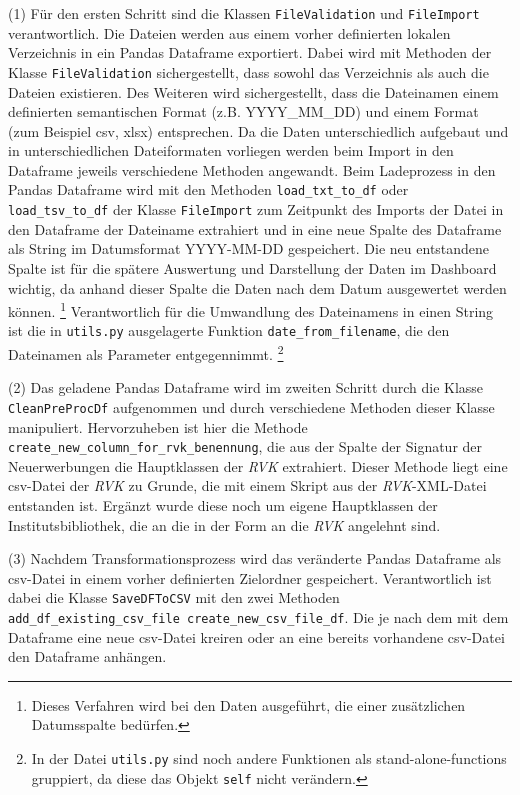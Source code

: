     
    (1) Für den ersten Schritt sind die Klassen \texttt{FileValidation} und \texttt{FileImport} verantwortlich.
    Die Dateien werden aus einem vorher definierten lokalen Verzeichnis in ein Pandas Dataframe exportiert. 
    Dabei wird mit Methoden der Klasse \texttt{FileValidation} sichergestellt, dass sowohl das Verzeichnis als auch die Dateien existieren. 
    Des Weiteren wird sichergestellt, dass die Dateinamen einem definierten semantischen Format (z.B. YYYY\_MM\_DD) und 
    einem Format (zum Beispiel csv, xlsx) entsprechen. Da die Daten unterschiedlich aufgebaut und in unterschiedlichen Dateiformaten vorliegen 
    werden beim Import in den Dataframe jeweils verschiedene Methoden angewandt.
    Beim Ladeprozess in den Pandas Dataframe wird mit den Methoden \texttt{load\_txt\_to\_df} oder \texttt{load\_tsv\_to\_df} der Klasse \texttt{FileImport} 
    zum Zeitpunkt des Imports der Datei in den Dataframe der Dateiname extrahiert und in eine neue Spalte des Dataframe als String 
    im Datumsformat YYYY-MM-DD gespeichert. Die neu entstandene Spalte ist für die spätere Auswertung und Darstellung der Daten im Dashboard wichtig, 
    da anhand dieser Spalte die Daten nach dem Datum ausgewertet werden können.
    \footnote{Dieses Verfahren wird bei den Daten ausgeführt, die einer zusätzlichen Datumsspalte bedürfen.} 
    Verantwortlich für die Umwandlung des Dateinamens in einen String ist die in \texttt{utils.py} ausgelagerte Funktion \texttt{date\_from\_filename},
    die den Dateinamen als Parameter entgegennimmt.
    \footnote{In der Datei \texttt{utils.py} sind noch andere Funktionen als stand-alone-functions gruppiert, da diese das Objekt \texttt{self} nicht verändern.} 
    
    (2) Das geladene Pandas Dataframe wird im zweiten Schritt durch die Klasse \texttt{CleanPreProcDf} aufgenommen und durch verschiedene Methoden dieser Klasse
    manipuliert. Hervorzuheben ist hier die Methode \texttt{create\_new\_column\_for\_rvk\_benennung}, die aus der Spalte der Signatur 
    der Neuerwerbungen die Hauptklassen der \textit{\acrlong{RVK}} extrahiert. Dieser Methode liegt eine csv-Datei
    der \textit{\acrshort{RVK}} zu Grunde, die mit einem Skript aus der \textit{\acrshort{RVK}}-XML-Datei entstanden ist. Ergänzt wurde diese noch um eigene Hauptklassen 
    der Institutsbibliothek, die an die in der Form an die \textit{\acrshort{RVK}} angelehnt sind.
     
    (3) Nachdem Transformationsprozess wird das veränderte Pandas Dataframe als csv-Datei in einem vorher definierten Zielordner gespeichert. 
    Verantwortlich ist dabei die Klasse \texttt{SaveDFToCSV} mit den zwei Methoden \texttt{add\_df\_existing\_csv\_file create\_new\_csv\_file\_df}. 
    Die je nach dem mit dem Dataframe eine neue csv-Datei kreiren oder an eine bereits vorhandene csv-Datei den Dataframe anhängen.
    
